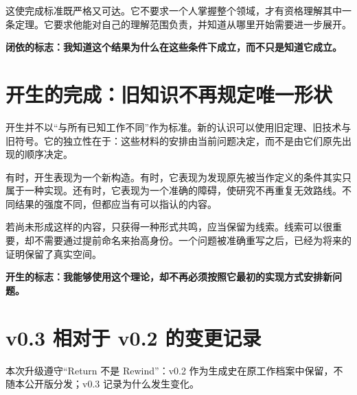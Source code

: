 \documentclass[UTF8,zihao=-4,fontset=none,oneside,openany]{ctexbook}
\newcommand{\lead}[1]{\par\noindent\textbf{#1}\par\nobreak\vspace{3pt}}
\begin{document}
这使完成标准既严格又可达。它不要求一个人掌握整个领域，才有资格理解其中一条定理。它要求他能对自己的理解范围负责，并知道从哪里开始需要进一步展开。

\lead{闭依的标志：我知道这个结果为什么在这些条件下成立，而不只是知道它成立。}

\section{开生的完成：旧知识不再规定唯一形状}
开生并不以“与所有已知工作不同”作为标准。新的认识可以使用旧定理、旧技术与旧符号。它的独立性在于：这些材料的安排由当前问题决定，而不是由它们原先出现的顺序决定。

有时，开生表现为一个新构造。有时，它表现为发现原先被当作定义的条件其实只属于一种实现。还有时，它表现为一个准确的障碍，使研究不再重复无效路线。不同结果的强度不同，但都应当有可以指认的内容。

若尚未形成这样的内容，只获得一种形式共鸣，应当保留为线索。线索可以很重要，却不需要通过提前命名来抬高身份。一个问题被准确重写之后，已经为将来的证明保留了真实空间。

\lead{开生的标志：我能够使用这个理论，却不再必须按照它最初的实现方式安排新问题。}

\section{v0.3 相对于 v0.2 的变更记录}
本次升级遵守“Return 不是 Rewind”：v0.2 作为生成史在原工作档案中保留，不随本公开版分发；v0.3 记录为什么发生变化。
\end{document}

